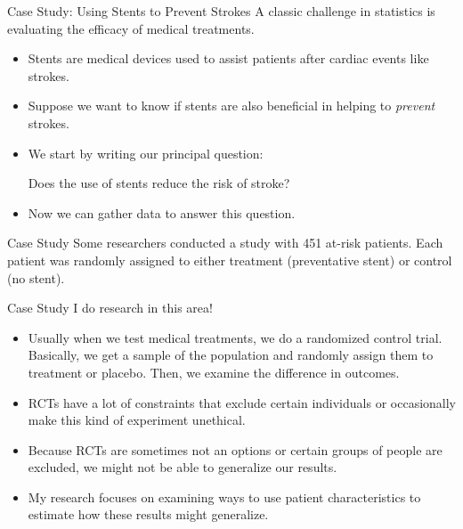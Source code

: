 \begin{frame}{Case Study: Using Stents to Prevent Strokes}
    A classic challenge in statistics is evaluating the efficacy of medical treatments. 
    \begin{itemize}
        \item Stents are medical devices used to assist patients after cardiac events like strokes.
        \item Suppose we want to know if stents are also beneficial in helping to \textit{prevent} strokes.
        \item We start by writing our principal question: \\ \begin{center}
            Does the use of stents reduce the risk of stroke?
        \end{center}
        \item Now we can gather data to answer this question. 
    \end{itemize}
\end{frame}

\begin{frame}{Case Study}
    Some researchers conducted a study with 451 at-risk patients. Each patient was randomly assigned to either treatment (preventative stent) or control (no stent).
\end{frame}

\begin{frame}{Case Study}
    I do research in this area! 
    \begin{itemize}
        \item Usually when we test medical treatments, we do a randomized control trial. Basically, we get a sample of the population and randomly assign them to treatment or placebo. Then, we examine the difference in outcomes.
        \item RCTs have a lot of constraints that exclude certain individuals or occasionally make this kind of experiment unethical. 
        \item Because RCTs are sometimes not an options or certain groups of people are excluded, we might not be able to generalize our results.
        \item My research focuses on examining ways to use patient characteristics to estimate how these results might generalize.
    \end{itemize}
\end{frame}